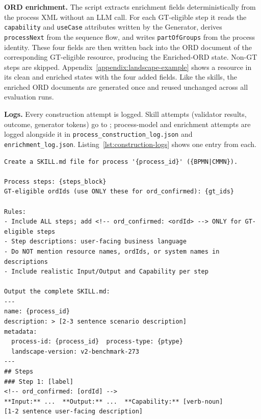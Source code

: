 \medskip\noindent\textbf{ORD enrichment.} The script  extracts enrichment fields deterministically from the process XML without an LLM call. For each GT-eligible step it reads the \texttt{capability} and \texttt{useCase} attributes written by the Generator, derives \texttt{processNext} from the sequence flow, and writes \texttt{partOfGroups} from the process identity. These four fields are then written back into the ORD document of the corresponding GT-eligible resource, producing the Enriched-ORD state. Non-GT steps are skipped. Appendix~\ref{appendix:landscape-example} shows a resource in its clean and enriched states with the four added fields. Like the skills, the enriched ORD documents are generated once and reused unchanged across all evaluation runs.

\medskip\noindent\textbf{Logs.} Every construction attempt is logged. Skill attempts (validator results, outcome, generator tokens) go to ; process-model and enrichment attempts are logged alongside it in \texttt{process\_construction\_log.json} and \texttt{enrichment\_log.json}. Listing~\ref{lst:construction-logs} shows one entry from each.



\begin{lstlisting}[float=!t, floatplacement=!t, basicstyle=\ttfamily\scriptsize, breaklines=true, frame=single, label={lst:skill-gen-prompt}, caption={SKILL.md Generator prompt.}]
Create a SKILL.md file for process '{process_id}' ({BPMN|CMMN}).

Process steps: {steps_block}
GT-eligible ordIds (use ONLY these for ord_confirmed): {gt_ids}

Rules:
- Include ALL steps; add <!-- ord_confirmed: <ordId> --> ONLY for GT-eligible steps
- Step descriptions: user-facing business language
- Do NOT mention resource names, ordIds, or system names in descriptions
- Include realistic Input/Output and Capability per step

Output the complete SKILL.md:
---
name: {process_id}
description: > [2-3 sentence scenario description]
metadata:
  process-id: {process_id}  process-type: {ptype}
  landscape-version: v2-benchmark-273
---
## Steps
### Step 1: [label]
<!-- ord_confirmed: [ordId] -->
**Input:** ...  **Output:** ...  **Capability:** [verb-noun]
[1-2 sentence user-facing description]
\end{lstlisting}

